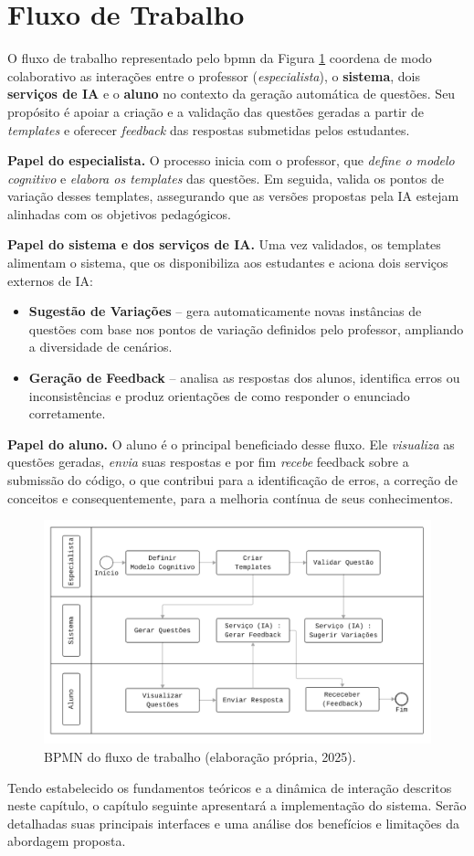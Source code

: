  
\section{Fluxo de Trabalho}


O fluxo de trabalho representado pelo \gls{bpmn} da Figura \ref{fig:bpmn-fluxo} coordena de modo colaborativo as interações entre o professor (\emph{especialista}), o \textbf{sistema}, dois \textbf{serviços de IA} e o \textbf{aluno} no contexto da geração automática de questões. Seu propósito é apoiar a criação e a validação das questões geradas a partir de \textit{templates} e oferecer \textit{feedback} das respostas submetidas pelos estudantes.

\textbf{Papel do especialista.} O processo inicia com o professor, que \emph{define o modelo cognitivo} e \emph{elabora os templates} das questões. Em seguida, valida os pontos de variação desses templates, assegurando que as versões propostas pela IA estejam alinhadas com os objetivos pedagógicos.

\textbf{Papel do sistema e dos serviços de IA.} Uma vez validados, os templates alimentam o sistema, que os disponibiliza aos estudantes e aciona dois serviços externos de IA:

\begin{itemize}
\item \textbf{Sugestão de Variações} – gera automaticamente novas instâncias de questões com base nos pontos de variação definidos pelo professor, ampliando a diversidade de cenários.
\item \textbf{Geração de Feedback} – analisa as respostas dos alunos, identifica erros ou inconsistências e produz orientações de como responder o enunciado corretamente.
\end{itemize}

\textbf{Papel do aluno.} O aluno é o principal beneficiado desse fluxo. Ele \emph{visualiza} as questões geradas, \emph{envia} suas respostas e por fim \emph{recebe} feedback sobre a submissão do código, o que contribui para a identificação de erros, a correção de conceitos e consequentemente, para a melhoria contínua de seus conhecimentos.

\begin{figure}[ht]
\centering
\includegraphics[width=16cm]{./imagens/capitulo6/bpmn-fluxo}
\caption{BPMN do fluxo de trabalho (elaboração própria, 2025).}
\label{fig:bpmn-fluxo}
\end{figure}

\bigskip
\noindent


Tendo estabelecido os fundamentos teóricos e a dinâmica de interação descritos neste capítulo, o capítulo seguinte apresentará a implementação do sistema. Serão detalhadas suas principais interfaces e uma análise dos benefícios e limitações da abordagem proposta.